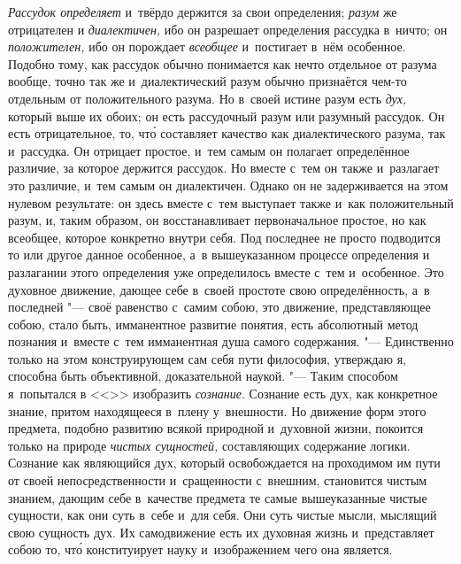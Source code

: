 {\em Рассудок определяет} и~твёрдо держится за свои определения; {\em разум} же
отрицателен и {\em диалектичен,} ибо он разрешает определения рассудка в~ничто;
он {\em положителен,} ибо он порождает {\em всеобщее} и~постигает в~нём
особенное. Подобно тому, как рассудок обычно понимается как нечто отдельное от
разума вообще, точно так же и~диалектический разум обычно признаётся чем-то
отдельным от положительного разума. Но в~своей истине разум есть {\em дух,}
который выше их обоих; он есть рассудочный разум или разумный рассудок. Он есть
отрицательное, то, чт\'{о} составляет качество как диалектического разума, так
и~рассудка. Он отрицает простое, и~тем самым он полагает определённое различие,
за которое держится рассудок. Но вместе с~тем он также и~разлагает это
различие, и~тем самым он диалектичен. Однако он не задерживается на этом
нулевом результате: он здесь вместе с~тем выступает также и~как положительный
разум, и, таким образом, он восстанавливает первоначальное простое, но как
всеобщее, которое конкретно внутри себя. Под последнее не просто подводится то
или другое данное особенное, а~в вышеуказанном процессе определения и
разлагании этого определения уже определилось вместе с~тем и~особенное. Это
духовное движение, дающее себе в~своей простоте свою определённость, а~в
последней "--- своё равенство с~самим собою, это движение, представляющее
собою, стало быть, имманентное развитие понятия, есть абсолютный метод познания
и~вместе с~тем имманентная душа самого содержания. "--- Единственно только на
этом конструирующем сам себя пути философия, утверждаю я, способна быть
объективной, доказательной наукой. "--- Таким способом я~попытался в
<<>> изобразить {\em сознание}. Сознание есть дух, как
конкретное знание, притом находящееся в~плену у~внешности. Но движение форм
этого предмета, подобно развитию всякой природной и~духовной жизни, покоится
только на природе {\em чистых сущностей,} составляющих содержание логики.
Сознание как являющийся дух, который освобождается на проходимом им пути от
своей непосредственности и~сращенности с~внешним, становится чистым знанием,
дающим себе в~качестве предмета те самые вышеуказанные чистые сущности, как они
суть в~себе и~для себя. Они суть чистые мысли, мыслящий свою сущность дух. Их
самодвижение есть их духовная жизнь и~представляет собою то, чт\'{о}
конституирует науку и~изображением чего она является.

